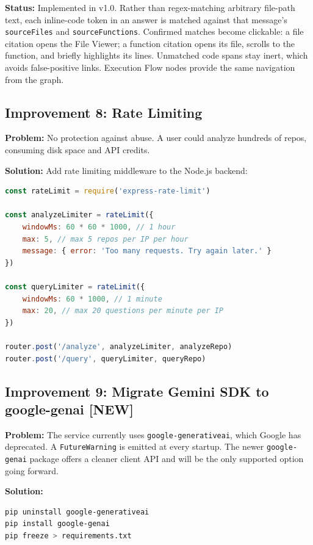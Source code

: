 \documentclass[a4paper,11pt]{article}
\begin{document}
\textbf{Status:} Implemented in v1.0. Rather than regex-matching arbitrary file-path text, each inline-code token in an answer is matched against that message's \texttt{sourceFiles} and \texttt{sourceFunctions}. Confirmed matches become clickable: a file citation opens the File Viewer; a function citation opens its file, scrolls to the function, and briefly highlights its lines. Unmatched code spans stay inert, which avoids false-positive links. Execution Flow nodes provide the same navigation from the graph.

\subsection{Improvement 8: Rate Limiting}

\textbf{Problem:} No protection against abuse. A user could analyze hundreds of repos, consuming disk space and API credits.

\textbf{Solution:} Add rate limiting middleware to the Node.js backend:
\begin{lstlisting}[language=JavaScript]
const rateLimit = require('express-rate-limit')

const analyzeLimiter = rateLimit({
    windowMs: 60 * 60 * 1000, // 1 hour
    max: 5, // max 5 repos per IP per hour
    message: { error: 'Too many requests. Try again later.' }
})

const queryLimiter = rateLimit({
    windowMs: 60 * 1000, // 1 minute
    max: 20, // max 20 questions per minute per IP
})

router.post('/analyze', analyzeLimiter, analyzeRepo)
router.post('/query', queryLimiter, queryRepo)
\end{lstlisting}

\subsection{Improvement 9: Migrate Gemini SDK to google-genai \textbf{[NEW]}}

\textbf{Problem:} The service currently uses \texttt{google-generativeai}, which Google has deprecated. A \texttt{FutureWarning} is emitted at every startup. The newer \texttt{google-genai} package offers a cleaner client API and will be the only supported option going forward.

\textbf{Solution:}
\begin{lstlisting}[language=bash]
pip uninstall google-generativeai
pip install google-genai
pip freeze > requirements.txt
\end{lstlisting}
\end{document}
